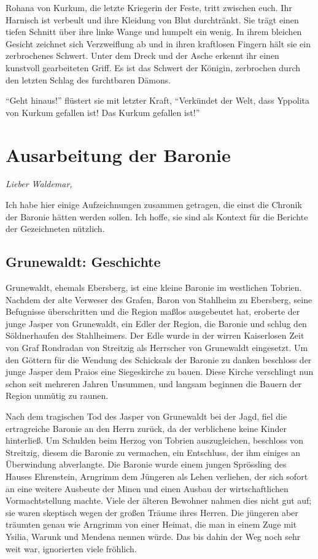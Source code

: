 Rohana von Kurkum, die letzte Kriegerin der Feste, tritt zwischen euch. Ihr Harnisch ist verbeult und ihre Kleidung von Blut durchtränkt. Sie trägt einen tiefen Schnitt über ihre linke Wange und humpelt ein wenig. In ihrem bleichen Gesicht zeichnet sich Verzweiflung ab und in ihren kraftlosen Fingern hält sie ein zerbrochenes Schwert. Unter dem Dreck und der Asche erkennt ihr einen kunstvoll gearbeiteten Griff. Es ist das Schwert der Königin, zerbrochen durch den letzten Schlag des furchtbaren Dämons.

``Geht hinaus!'' flüstert sie mit letzter Kraft, ``Verkündet der Welt, dass Yppolita von Kurkum gefallen ist! Das Kurkum gefallen ist!''

\chapter{Ausarbeitung der Baronie}

{\itshape
Lieber Waldemar,

Ich habe hier einige Aufzeichnungen zusammen getragen, die einst die Chronik der Baronie hätten werden sollen. Ich hoffe, sie sind als Kontext für die Berichte der Gezeichneten nützlich.
}

\section{Grunewaldt: Geschichte}

Grunewaldt, ehemals Ebersberg, ist eine kleine Baronie im westlichen Tobrien. Nachdem der alte Verweser des Grafen, Baron von Stahlheim zu Ebersberg, seine Befugnisse überschritten und die Region maßlos ausgebeutet hat, eroberte der junge Jasper von Grunewaldt, ein Edler der Region, die Baronie und schlug den Söldnerhaufen des Stahlheimers. Der Edle wurde in der wirren Kaiserlosen Zeit von Graf Rondradan von Streitzig als Herrscher von Grunewaldt eingesetzt. Um den Göttern für die Wendung des Schicksals der Baronie zu danken beschloss der junge Jasper dem Praios eine Siegeskirche zu bauen. Diese Kirche verschlingt nun schon seit mehreren Jahren Unsummen, und langsam beginnen die Bauern der Region unmütig zu raunen.

Nach dem tragischen Tod des Jasper von Grunewaldt bei der Jagd, fiel die ertragreiche Baronie an den Herrn zurück, da der verblichene keine Kinder hinterließ. Um Schulden beim Herzog von Tobrien auszugleichen, beschloss von Streitzig, diesem die Baronie zu vermachen, ein Entschluss, der ihm einiges an Überwindung abverlangte. Die Baronie wurde einem jungen Sprössling des Hauses Ehrenstein, Arngrimm dem Jüngeren als Lehen verliehen, der sich sofort an eine weitere Ausbeute der Minen und einen Ausbau der wirtschaftlichen Vormachtstellung machte. Viele der älteren Bewohner nahmen dies nicht gut auf; sie waren skeptisch wegen der großen Träume ihres Herren. Die jüngeren aber träumten genau wie Arngrimm von einer Heimat, die man in einem Zuge mit Ysilia, Warunk und Mendena nennen würde. Das bis dahin der Weg noch sehr weit war, ignorierten viele fröhlich.

